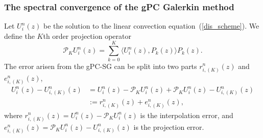 \documentclass[12pt]{article}
\theoremstyle{plain}
\theoremstyle{remark}
\theoremstyle{remark}
\theoremstyle{remark}
\numberwithin{equation}{section}
\newcommand{\p}{\mathcal{P}}
\newcommand{\Uniz}{U^n_i(z)}
\newcommand{\UniK}{U^n_{i,(K)}}
\begin{document}
\subsubsection{The  spectral convergence of the gPC Galerkin method}
Let $\Uniz$ be the solution to the linear convection equation~(\ref{dis_scheme}). We define the $K$th order projection operator
\begin{equation}
  \p_K \Uniz = \sum_{k=0}^K \big\langle \Uniz, P_k(z) \big\rangle P_k(z).
\end{equation}
The error arisen from the gPC-SG can be split into two parts $r^n_{i,(K)}(z)$ and $e^n_{i,(K)}(z)$,
\begin{equation}\label{split}
  \begin{split}
    \Uniz - \UniK(z) & = \Uniz - \p_K \Uniz + \p_K \Uniz - \UniK(z)\\
    & := r^n_{i,(K)}(z) + e^n_{i,(K)}(z),
  \end{split}
\end{equation}
where $r^n_{i,(K)}(z) = \Uniz - \p_K \Uniz$ is the interpolation error, and $e^n_{i,(K)}(z)=\p_K \Uniz - \UniK(z)$ is the projection error.
\end{document}
